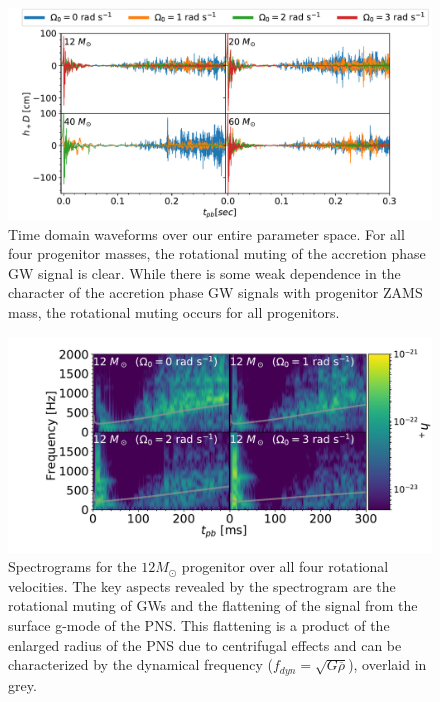 \documentclass[twocolumn,times]{aastex62}  %
\begin{document}
\begin{figure}[t]
\includegraphics[width=\textwidth]{ccsn2D_M1_all.pdf}
\centering
\caption{Time domain waveforms over our entire parameter space.  For all four progenitor masses, the rotational muting of the accretion phase GW signal is clear.  While there is some weak dependence in the character of the accretion phase GW signals with progenitor ZAMS mass, the rotational muting occurs for all progenitors.}
\label{fig:ccsn_all}
\end{figure}

\begin{figure}[t]
    \centering
    \includegraphics[trim=80 0 0 0, scale=0.38]{gws_2x2_line_test_size.pdf}
    \caption{Spectrograms for the $12 M_\odot$ progenitor over all four rotational velocities.  The key aspects revealed by the spectrogram are the rotational muting of GWs and the flattening of the signal from the surface g-mode of the PNS.  This flattening is a product of the enlarged radius of the PNS due to centrifugal effects and can be characterized by the dynamical frequency ($f_{dyn} = \sqrt{G \overline{\rho}}$), overlaid in grey.}
    \label{fig:2x2}
\end{figure}
\end{document}
